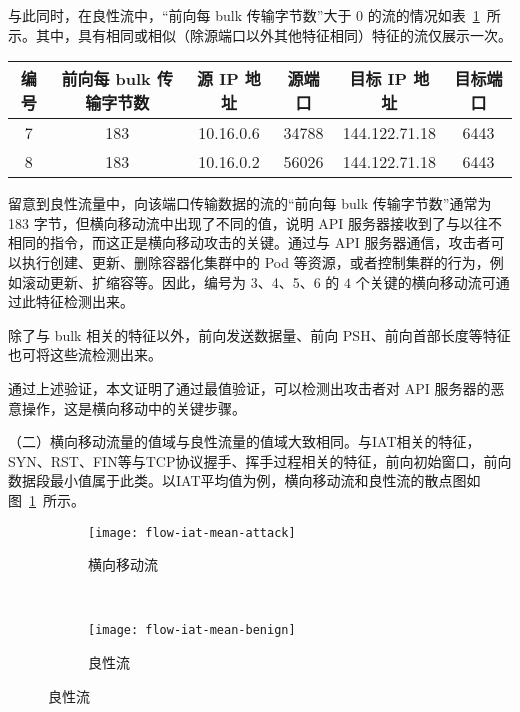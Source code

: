 {与此同时，在良性流中，“前向每 bulk 传输字节数”大于 0 的流的情况如表~\ref{tab:dataset-benign-bulks}~所示。其中，具有相同或相似（除源端口以外其他特征相同）特征的流仅展示一次。

\begin{table}[!htbp]
    \label{tab:dataset-benign-bulks}
    \centering
    \footnotesize%
    \setlength{\tabcolsep}{4pt}%
    \renewcommand{\arraystretch}{1.2}%
    \begin{tabular}{cccccc}
        \hline
        编号 & 前向每 bulk 传输字节数 & 源 IP 地址 & 源端口 & 目标 IP 地址 & 目标端口\\
        \hline
        7 & 183 & 10.16.0.6 & 34788 & 144.122.71.18 & 6443\\
        8 & 183 & 10.16.0.2 & 56026 & 144.122.71.18 & 6443\\
        \hline
    \end{tabular}
\end{table}

留意到良性流量中，向该端口传输数据的流的“前向每 bulk 传输字节数”通常为 183 字节，但横向移动流中出现了不同的值，说明 API 服务器接收到了与以往不相同的指令，而这正是横向移动攻击的关键。通过与 API 服务器通信，攻击者可以执行创建、更新、删除容器化集群中的 Pod 等资源，或者控制集群的行为，例如滚动更新、扩缩容等。因此，编号为 3、4、5、6 的 $4$ 个关键的横向移动流可通过此特征检测出来。

除了与 bulk 相关的特征以外，前向发送数据量、前向 PSH、前向首部长度等特征也可将这些流检测出来。

通过上述验证，本文证明了通过最值验证，可以检测出攻击者对 API 服务器的恶意操作，这是横向移动中的关键步骤。

（二）横向移动流量的值域与良性流量的值域大致相同。与IAT相关的特征，SYN、RST、FIN等与TCP协议握手、挥手过程相关的特征，前向初始窗口，前向数据段最小值属于此类。以IAT平均值为例，横向移动流和良性流的散点图如图~\ref{fig:flow-iat-mean}~所示。

\begin{figure}[!htbp]
    \centering
    \begin{subfigure}[b]{0.48\textwidth}
      \texttt{[image: flow-iat-mean-attack]}
      \caption{横向移动流}
    \end{subfigure}%
    ~%
    \begin{subfigure}[b]{0.48\textwidth}
      \texttt{[image: flow-iat-mean-benign]}
      \caption{良性流}
    \end{subfigure}
    \label{fig:flow-iat-mean}
\end{figure}

}
